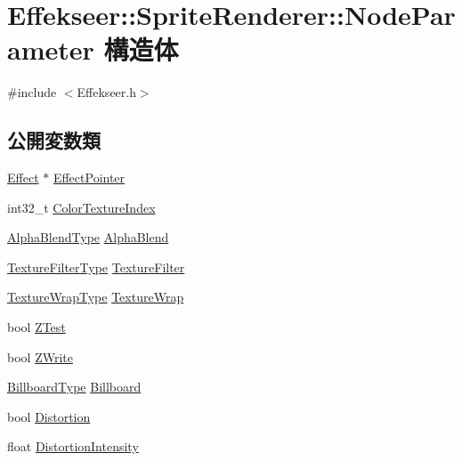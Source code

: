 \hypertarget{struct_effekseer_1_1_sprite_renderer_1_1_node_parameter}{}\section{Effekseer\+:\+:Sprite\+Renderer\+:\+:Node\+Parameter 構造体}
\label{struct_effekseer_1_1_sprite_renderer_1_1_node_parameter}


{\ttfamily \#include $<$Effekseer.\+h$>$}

\subsection*{公開変数類}
\begin{DoxyCompactItemize}
\item 
\mbox{\hyperlink{class_effekseer_1_1_effect}{Effect}} $\ast$ \mbox{\hyperlink{struct_effekseer_1_1_sprite_renderer_1_1_node_parameter_ae7a9251a7888b0a1e42271a6bbfc9729}{Effect\+Pointer}}
\item 
int32\+\_\+t \mbox{\hyperlink{struct_effekseer_1_1_sprite_renderer_1_1_node_parameter_a73ccb925cd40ba3d09365e92b28a46e9}{Color\+Texture\+Index}}
\item 
\mbox{\hyperlink{namespace_effekseer_a8c32fd5b7ec7feed73314b2ae8086949}{Alpha\+Blend\+Type}} \mbox{\hyperlink{struct_effekseer_1_1_sprite_renderer_1_1_node_parameter_a1b14867e8d71ab1836d732866df2c973}{Alpha\+Blend}}
\item 
\mbox{\hyperlink{namespace_effekseer_ae3518502cfcb4ec4991f13c0b3e4c6ee}{Texture\+Filter\+Type}} \mbox{\hyperlink{struct_effekseer_1_1_sprite_renderer_1_1_node_parameter_aceda3fc02091f9401fd1cb55596fe7c6}{Texture\+Filter}}
\item 
\mbox{\hyperlink{namespace_effekseer_a5320c83784602974b6278bf1a77b58a3}{Texture\+Wrap\+Type}} \mbox{\hyperlink{struct_effekseer_1_1_sprite_renderer_1_1_node_parameter_a27464e2580b3ba3a78fb6efceb6081fc}{Texture\+Wrap}}
\item 
bool \mbox{\hyperlink{struct_effekseer_1_1_sprite_renderer_1_1_node_parameter_a74aa302d891f7f84cf97ed55754a792b}{Z\+Test}}
\item 
bool \mbox{\hyperlink{struct_effekseer_1_1_sprite_renderer_1_1_node_parameter_abc1cbe53f5f3fd0b6b72470774b47f52}{Z\+Write}}
\item 
\mbox{\hyperlink{namespace_effekseer_a1e51959dc188f6f19acc48c85860c6d8}{Billboard\+Type}} \mbox{\hyperlink{struct_effekseer_1_1_sprite_renderer_1_1_node_parameter_afdff1396f25b0c387eb5a57580364ba0}{Billboard}}
\item 
bool \mbox{\hyperlink{struct_effekseer_1_1_sprite_renderer_1_1_node_parameter_aae6a39601c61032914529de573cb5e32}{Distortion}}
\item 
float \mbox{\hyperlink{struct_effekseer_1_1_sprite_renderer_1_1_node_parameter_aab3176045ff052d13ab49a55edb9bb74}{Distortion\+Intensity}}
\end{DoxyCompactItemize}


